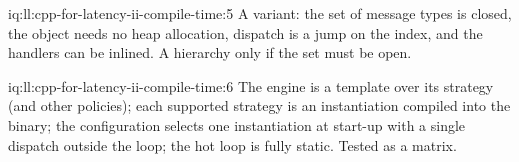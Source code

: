 \begin{solution}{iq:ll:cpp-for-latency-ii-compile-time:5}
A variant: the set of message types is closed, the object needs no heap allocation, dispatch is a jump on the index, and
the handlers can be inlined. A hierarchy only if the set must be open.
\end{solution}

\begin{solution}{iq:ll:cpp-for-latency-ii-compile-time:6}
The engine is a template over its strategy (and other policies); each supported strategy is an instantiation compiled into
the binary; the configuration selects one instantiation at start-up with a single dispatch outside the loop; the hot loop
is fully static. Tested as a matrix.
\end{solution}

